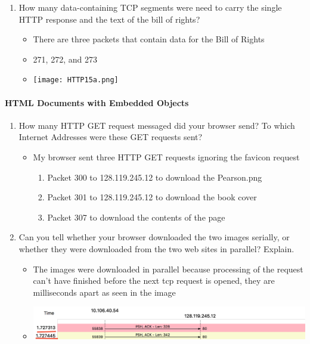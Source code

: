 \documentclass{article}
\begin{document}
\begin{itemize}
\begin{enumerate}
      \item How many data-containing TCP segments were need to carry the single HTTP response and the text of the bill of rights?
        \begin{itemize}
          \item There are three packets that contain data for the Bill of Rights
          \item 271, 272, and 273
          \item \texttt{[image: HTTP15a.png]}
        \end{itemize}
      \end{enumerate}

    \paragraph{HTML Documents with Embedded Objects}
    \begin{enumerate}
      \item How many HTTP GET request messaged did your browser send?  To which Internet Addresses were these GET requests sent?
      \begin{itemize}
        \item My browser sent three HTTP GET requests ignoring the favicon request
          \begin{enumerate}
            \item Packet 300 to 128.119.245.12 to download the Pearson.png
            \item Packet 301 to 128.119.245.12 to download the book cover
            \item Packet 307 to download the contents of the page
          \end{enumerate}
      \end{itemize}

      \item Can you tell whether your browser downloaded the two images serially, or whether they were downloaded from the two web sites in parallel?  Explain.
      \begin{itemize}
        \item The images were downloaded in parallel because processing of the request can't have finished before the next tcp request is opened, they are milliseconds apart as seen in the image
        \item \includegraphics[scale=0.5]{images/HTTP18.png}
      \end{itemize}

  \end{enumerate}
  \end{itemize}
\end{document}
